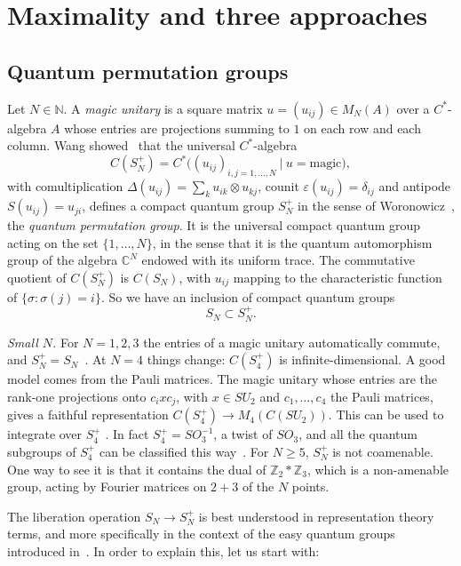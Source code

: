 \documentclass[11pt]{amsart}
\theoremstyle{definition}
\theoremstyle{remark}
\theoremstyle{plain}
\numberwithin{equation}{section}
\numberwithin{table}{section}
\newcommand{\C}{\mathbb C}
\newcommand{\Z}{\mathbb Z}
\begin{document}
\section{Maximality and three approaches}\label{sec:maximality}

\subsection{Quantum permutation groups}

Let $N\in\mathbb N$. A \emph{magic unitary} is a square matrix $u=(u_{ij})\in M_N(A)$ over a $C^*$-algebra $A$ whose entries are projections summing to $1$ on each row and each column. Wang showed~\cite{wa} that the universal $C^*$-algebra
\[
C(S_N^+)=C^*\Big((u_{ij})_{i,j=1,\dots,N}\ \Big|\ u=\text{magic}\Big),
\]
with comultiplication $\Delta(u_{ij})=\sum_ku_{ik}\otimes u_{kj}$, counit $\varepsilon(u_{ij})=\delta_{ij}$ and antipode $S(u_{ij})=u_{ji}$, defines a compact quantum group $S_N^+$ in the sense of Woronowicz~\cite{wo1}, the \emph{quantum permutation group}. It is the universal compact quantum group acting on the set $\{1,\dots,N\}$, in the sense that it is the quantum automorphism group of the algebra $\C^N$ endowed with its uniform trace. The commutative quotient of $C(S_N^+)$ is $C(S_N)$, with $u_{ij}$ mapping to the characteristic function of $\{\sigma:\sigma(j)=i\}$. So we have an inclusion of compact quantum groups
\[
S_N\subset S_N^+ .
\]

\emph{Small $N$.} For $N=1,2,3$ the entries of a magic unitary automatically commute, and $S_N^+=S_N$~\cite{wa}. At $N=4$ things change: $C(S_4^+)$ is infinite-dimensional. A good model comes from the Pauli matrices. The magic unitary whose entries are the rank-one projections onto $c_ix c_j$, with $x\in SU_2$ and $c_1,\dots,c_4$ the Pauli matrices, gives a faithful representation $C(S_4^+)\to M_4(C(SU_2))$. This can be used to integrate over $S_4^+$ \cite{bc}. In fact $S_4^+=SO_3^{-1}$, a twist of $SO_3$, and all the quantum subgroups of $S_4^+$ can be classified this way~\cite{bb}. For $N\ge5$, $S_N^+$ is not coamenable. One way to see it is that it contains the dual of $\Z_2*\Z_3$, which is a non-amenable group, acting by Fourier matrices on $2+3$ of the $N$ points.

The liberation operation $S_N\to S_N^+$ is best understood in representation theory terms, and more specifically in the context of the easy quantum groups introduced in~\cite{bsp}. In order to explain this, let us start with:
\end{document}
